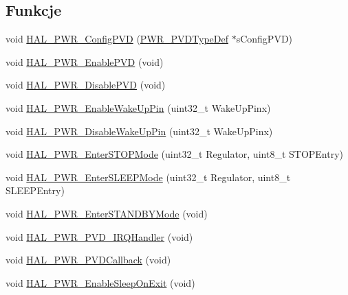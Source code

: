 \subsection*{Funkcje}
\begin{DoxyCompactItemize}
\item 
void \hyperlink{group___p_w_r___exported___functions___group2_ga87e59191de350b0942847624ddbe6d9d}{H\+A\+L\+\_\+\+P\+W\+R\+\_\+\+Config\+P\+VD} (\hyperlink{struct_p_w_r___p_v_d_type_def}{P\+W\+R\+\_\+\+P\+V\+D\+Type\+Def} $\ast$s\+Config\+P\+VD)
\item 
void \hyperlink{group___p_w_r___exported___functions___group2_ga729c254eac1847073d8a55621384107d}{H\+A\+L\+\_\+\+P\+W\+R\+\_\+\+Enable\+P\+VD} (void)
\item 
void \hyperlink{group___p_w_r___exported___functions___group2_ga3a843cc2fd1a1bb02c7f2dfa355bf9ec}{H\+A\+L\+\_\+\+P\+W\+R\+\_\+\+Disable\+P\+VD} (void)
\item 
void \hyperlink{group___p_w_r___exported___functions___group2_gaa76f42833a89110293f687b034164916}{H\+A\+L\+\_\+\+P\+W\+R\+\_\+\+Enable\+Wake\+Up\+Pin} (uint32\+\_\+t Wake\+Up\+Pinx)
\item 
void \hyperlink{group___p_w_r___exported___functions___group2_gab12ca816929e23e36f5ed8f4ccdb1472}{H\+A\+L\+\_\+\+P\+W\+R\+\_\+\+Disable\+Wake\+Up\+Pin} (uint32\+\_\+t Wake\+Up\+Pinx)
\item 
void \hyperlink{group___p_w_r___exported___functions___group2_gacfca5f1062274423e08317c0a5a225fa}{H\+A\+L\+\_\+\+P\+W\+R\+\_\+\+Enter\+S\+T\+O\+P\+Mode} (uint32\+\_\+t Regulator, uint8\+\_\+t S\+T\+O\+P\+Entry)
\item 
void \hyperlink{group___p_w_r___exported___functions___group2_ga5c84f4e046525c22d233c8a3443fab5f}{H\+A\+L\+\_\+\+P\+W\+R\+\_\+\+Enter\+S\+L\+E\+E\+P\+Mode} (uint32\+\_\+t Regulator, uint8\+\_\+t S\+L\+E\+E\+P\+Entry)
\item 
void \hyperlink{group___p_w_r___exported___functions___group2_ga40736f74c169077fcd08f34470559aa2}{H\+A\+L\+\_\+\+P\+W\+R\+\_\+\+Enter\+S\+T\+A\+N\+D\+B\+Y\+Mode} (void)
\item 
void \hyperlink{group___p_w_r___exported___functions___group2_gae3403237bde597d72b32f0434932a047}{H\+A\+L\+\_\+\+P\+W\+R\+\_\+\+P\+V\+D\+\_\+\+I\+R\+Q\+Handler} (void)
\item 
void \hyperlink{group___p_w_r___exported___functions___group2_gaa4843b3eb7989f5b95e1218af4086940}{H\+A\+L\+\_\+\+P\+W\+R\+\_\+\+P\+V\+D\+Callback} (void)
\item 
void \hyperlink{group___p_w_r___exported___functions___group2_ga85d0154c96068b286072a64fca4c7e6a}{H\+A\+L\+\_\+\+P\+W\+R\+\_\+\+Enable\+Sleep\+On\+Exit} (void)

\end{DoxyCompactItemize}
